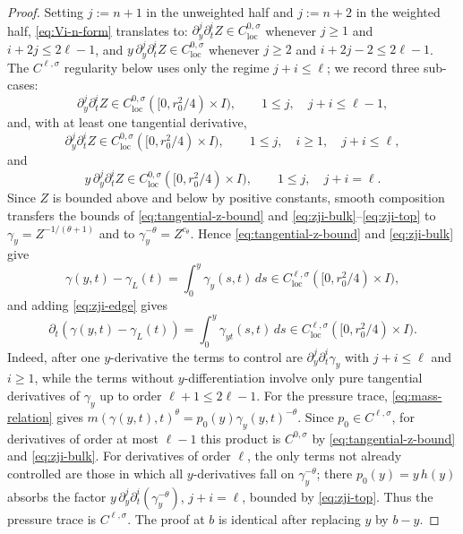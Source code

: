 \documentclass[10pt,a4paper]{amsart}
\newcommand{\dd}{\,d}
\newcommand{\loc}{\mathrm{loc}}
\begin{document}
\begin{proof}
Setting \(j:=n+1\) in the unweighted half and \(j:=n+2\) in the weighted
half, \eqref{eq:Vi-n-form} translates to: \(\partial_y^j\partial_t^iZ
\in C^{0,\sigma}_{\loc}\) whenever \(j\ge1\) and \(i+2j\le2\ell-1\), and
\(y\,\partial_y^j\partial_t^iZ\in C^{0,\sigma}_{\loc}\) whenever
\(j\ge2\) and \(i+2j-2\le2\ell-1\). The \(C^{\ell,\sigma}\) regularity
below uses only the regime \(j+i\le\ell\); we record three sub-cases:
\begin{equation}
\label{eq:zji-bulk}
        \partial_y^j\partial_t^iZ\in C^{0,\sigma}_{\loc}([0,r_0^2/4)\times I),
        \qquad 1\le j,\quad j+i\le\ell-1,
\end{equation}
and, with at least one tangential derivative,
\begin{equation}
\label{eq:zji-edge}
        \partial_y^j\partial_t^iZ\in C^{0,\sigma}_{\loc}([0,r_0^2/4)\times I),
        \qquad 1\le j,\quad i\ge1,\quad j+i\le\ell,
\end{equation}
and
\begin{equation}
\label{eq:zji-top}
        y\,\partial_y^j\partial_t^iZ\in C^{0,\sigma}_{\loc}([0,r_0^2/4)\times I),
        \qquad 1\le j,\quad j+i=\ell .
\end{equation}
Since \(Z\) is bounded above and below by positive constants, smooth
composition transfers the bounds of \eqref{eq:tangential-z-bound} and
\eqref{eq:zji-bulk}--\eqref{eq:zji-top} to
\(\gamma_y=Z^{-1/(\theta+1)}\) and to
\(\gamma_y^{-\theta}=Z^{c_\theta}\). Hence
\eqref{eq:tangential-z-bound} and \eqref{eq:zji-bulk} give
\[
        \gamma(y,t)-\gamma_L(t)
        =\int_0^y \gamma_y(s,t)\dd s
        \in C^{\ell,\sigma}_{\loc}([0,r_0^2/4)\times I),
\]
and adding \eqref{eq:zji-edge} gives
\[
        \partial_t\!\left(\gamma(y,t)-\gamma_L(t)\right)
        =\int_0^y \gamma_{yt}(s,t)\dd s
        \in C^{\ell,\sigma}_{\loc}([0,r_0^2/4)\times I).
\]
Indeed, after one \(y\)-derivative the terms to control are
\(\partial_y^j\partial_t^i\gamma_y\) with \(j+i\le\ell\) and \(i\ge1\), while
the terms without \(y\)-differentiation involve only pure tangential
derivatives of \(\gamma_y\) up to order \(\ell+1\le2\ell-1\).
For the pressure trace, \eqref{eq:mass-relation} gives
\(m(\gamma(y,t),t)^\theta=p_0(y)\gamma_y(y,t)^{-\theta}\).
Since \(p_0\in C^{\ell,\sigma}\), for derivatives of order at most
\(\ell-1\) this product is \(C^{0,\sigma}\) by
\eqref{eq:tangential-z-bound} and \eqref{eq:zji-bulk}. For derivatives
of order \(\ell\), the only terms not already controlled are those in
which all \(y\)-derivatives fall on \(\gamma_y^{-\theta}\); there
\(p_0(y)=y\,h(y)\) absorbs the factor
\(y\,\partial_y^j\partial_t^i(\gamma_y^{-\theta})\), \(j+i=\ell\),
bounded by \eqref{eq:zji-top}. Thus the pressure trace is
\(C^{\ell,\sigma}\). The proof at \(b\) is identical after replacing
\(y\) by \(b-y\).
\end{proof}
\end{document}
